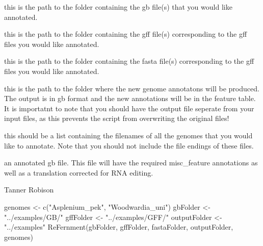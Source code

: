 \documentclass[letterpaper]{book}
\begin{document}
%
\begin{Arguments}
\begin{ldescription}
\item[\code{gbFolderPath}] this is the path to the folder containing the gb file(s)
that you would like annotated.

\item[\code{gffFolderPath}] this is the path to the folder containing the gff 
file(s) corresponding to the gff files you would like annotated.

\item[\code{fastaFolderPath}] this is the path to the folder containing the fasta
file(s) corresponding to the gff files you would like annotated.

\item[\code{outFolderPath}] this is the path to the folder where the new genome
annotatons will be produced. The output is in gb format and the new 
annotations will be in the feature table. It is importatnt to note that you
should have the output file seperate from your input files, as this prevents
the script from overwriting the original files!

\item[\code{genomes}] this should be a list containing the filenames of all the 
genomes that you would like to annotate. Note that you should not include
the file endings of these files.
\end{ldescription}
\end{Arguments}
%
\begin{Value}
an annotated gb file. This file will have the required misc\_feature
annotations as well as a translation corrected for RNA editing.
\end{Value}
%
\begin{Author}\relax
Tanner Robison
\end{Author}
%
\begin{Examples}
\begin{ExampleCode}
genomes <- c("Asplenium_pek", "Woodwardia_uni")
gbFolder <- "../examples/GB/"
gffFolder <- "../examples/GFF/"
outputFolder <- "../examples"
ReFernment(gbFolder, gffFolder, fastaFolder, outputFolder, genomes)

\end{ExampleCode}
\end{Examples}
\printindex{}
\end{document}
